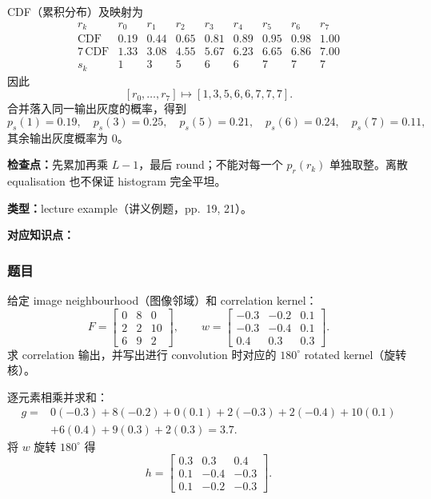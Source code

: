 \begin{checkedsolution}
CDF（累积分布）及映射为
\[
  \begin{array}{c|cccccccc}
    r_k&r_0&r_1&r_2&r_3&r_4&r_5&r_6&r_7\\ \hline
    \mathrm{CDF}&0.19&0.44&0.65&0.81&0.89&0.95&0.98&1.00\\
    7\,\mathrm{CDF}&1.33&3.08&4.55&5.67&6.23&6.65&6.86&7.00\\
    s_k&1&3&5&6&6&7&7&7
  \end{array}
\]
因此
\[
  \boxed{[r_0,\ldots,r_7]\mapsto[1,3,5,6,6,7,7,7]}.
\]
合并落入同一输出灰度的概率，得到
\[
  p_s(1)=0.19,
  \quad p_s(3)=0.25,
  \quad p_s(5)=0.21,
  \quad p_s(6)=0.24,
  \quad p_s(7)=0.11,
\]
其余输出灰度概率为 $0$。
\end{checkedsolution}

\textbf{检查点：}先累加再乘 $L-1$，最后 round；不能对每一个 $p_r(r_k)$ 单独取整。离散 equalisation 也不保证 histogram 完全平坦。


\textbf{类型：}lecture example（讲义例题，pp.~19, 21）。

\textbf{对应知识点：}

\subsubsection*{题目}

给定 image neighbourhood（图像邻域）和 correlation kernel：
\[
  F=
  \begin{bmatrix}
    0&8&0\\2&2&10\\6&9&2
  \end{bmatrix},
  \qquad
  w=
  \begin{bmatrix}
    -0.3&-0.2&0.1\\
    -0.3&-0.4&0.1\\
    0.4&0.3&0.3
  \end{bmatrix}.
\]
求 correlation 输出，并写出进行 convolution 时对应的 $180^\circ$ rotated kernel（旋转核）。

\begin{checkedsolution}
逐元素相乘并求和：
\[
\begin{aligned}
g={}&0(-0.3)+8(-0.2)+0(0.1)
  +2(-0.3)+2(-0.4)+10(0.1)\\
 &+6(0.4)+9(0.3)+2(0.3)
 =\boxed{3.7}.
\end{aligned}
\]
将 $w$ 旋转 $180^\circ$ 得
\[
  \boxed{
  h=
  \begin{bmatrix}
    0.3&0.3&0.4\\
    0.1&-0.4&-0.3\\
    0.1&-0.2&-0.3
  \end{bmatrix}}.
\]
\end{checkedsolution}

